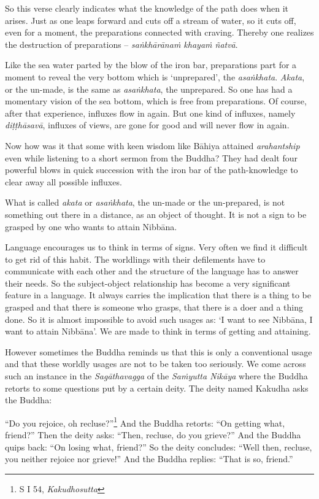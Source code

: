 So this verse clearly indicates what the knowledge of the path does when it arises. Just as one leaps forward and cuts off a stream of water, so it cuts off, even for a moment, the preparations connected with craving. Thereby one realizes the destruction of preparations -- \emph{saṅkhārānaṁ khayaṁ ñatvā}.

Like the sea water parted by the blow of the iron bar, preparations part for a moment to reveal the very bottom which is `unprepared', the \emph{asaṅkhata}. \emph{Akata}, or the un-made, is the same as \emph{asaṅkhata}, the unprepared. So one has had a momentary vision of the sea bottom, which is free from preparations. Of course, after that experience, influxes flow in again. But one kind of influxes, namely \emph{diṭṭhāsavā}, influxes of views, are gone for good and will never flow in again.

Now how was it that some with keen wisdom like Bāhiya attained \emph{arahantship} even while listening to a short sermon from the Buddha? They had dealt four powerful blows in quick succession with the iron bar of the path-knowledge to clear away all possible influxes.

What is called \emph{akata} or \emph{asaṅkhata}, the un-made or the un-prepared, is not something out there in a distance, as an object of thought. It is not a sign to be grasped by one who wants to attain Nibbāna.

Language encourages us to think in terms of signs. Very often we find it difficult to get rid of this habit. The worldlings with their defilements have to communicate with each other and the structure of the language has to answer their needs. So the subject-object relationship has become a very significant feature in a language. It always carries the implication that there is a thing to be grasped and that there is someone who grasps, that there is a doer and a thing done. So it is almost impossible to avoid such usages as: `I want to see Nibbāna, I want to attain Nibbāna'. We are made to think in terms of getting and attaining.

However sometimes the Buddha reminds us that this is only a conventional usage and that these worldly usages are not to be taken too seriously. We come across such an instance in the \emph{Sagāthavagga} of the \emph{Saṁyutta Nikāya} where the Buddha retorts to some questions put by a certain deity. The deity named Kakudha asks the Buddha:

``Do you rejoice, oh recluse?''\footnote{S I 54, \emph{Kakudhosutta}} And the Buddha retorts: ``On getting what, friend?'' Then the deity asks: ``Then, recluse, do you grieve?'' And the Buddha quips back: ``On losing what, friend?'' So the deity concludes: ``Well then, recluse, you neither rejoice nor grieve!'' And the Buddha replies: ``That is so, friend.''

